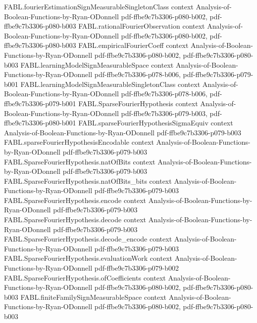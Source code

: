 \begin{theorem}
\proofstep
  {FABL.fourierEstimationSignMeasurableSingletonClass}
  {context}
  {Analysis-of-Boolean-Functions-by-Ryan-ODonnell}
  {pdf-ffbe9c7b3306-p080-b002,
    pdf-ffbe9c7b3306-p080-b003}
\proofstep
  {FABL.rationalFourierObservation}
  {context}
  {Analysis-of-Boolean-Functions-by-Ryan-ODonnell}
  {pdf-ffbe9c7b3306-p080-b002,
    pdf-ffbe9c7b3306-p080-b003}
\proofstep
  {FABL.empiricalFourierCoeff}
  {context}
  {Analysis-of-Boolean-Functions-by-Ryan-ODonnell}
  {pdf-ffbe9c7b3306-p080-b002,
    pdf-ffbe9c7b3306-p080-b003}
\proofstep
  {FABL.learningModelSignMeasurableSpace}
  {context}
  {Analysis-of-Boolean-Functions-by-Ryan-ODonnell}
  {pdf-ffbe9c7b3306-p078-b006,
    pdf-ffbe9c7b3306-p079-b001}
\proofstep
  {FABL.learningModelSignMeasurableSingletonClass}
  {context}
  {Analysis-of-Boolean-Functions-by-Ryan-ODonnell}
  {pdf-ffbe9c7b3306-p078-b006,
    pdf-ffbe9c7b3306-p079-b001}
\proofstep
  {FABL.SparseFourierHypothesis}
  {context}
  {Analysis-of-Boolean-Functions-by-Ryan-ODonnell}
  {pdf-ffbe9c7b3306-p079-b003,
    pdf-ffbe9c7b3306-p080-b001}
\proofstep
  {FABL.sparseFourierHypothesisSigmaEquiv}
  {context}
  {Analysis-of-Boolean-Functions-by-Ryan-ODonnell}
  {pdf-ffbe9c7b3306-p079-b003}
\proofstep
  {FABL.sparseFourierHypothesisEncodable}
  {context}
  {Analysis-of-Boolean-Functions-by-Ryan-ODonnell}
  {pdf-ffbe9c7b3306-p079-b003}
\proofstep
  {FABL.SparseFourierHypothesis.natOfBits}
  {context}
  {Analysis-of-Boolean-Functions-by-Ryan-ODonnell}
  {pdf-ffbe9c7b3306-p079-b003}
\proofstep
  {FABL.SparseFourierHypothesis.natOfBits_bits}
  {context}
  {Analysis-of-Boolean-Functions-by-Ryan-ODonnell}
  {pdf-ffbe9c7b3306-p079-b003}
\proofstep
  {FABL.SparseFourierHypothesis.encode}
  {context}
  {Analysis-of-Boolean-Functions-by-Ryan-ODonnell}
  {pdf-ffbe9c7b3306-p079-b003}
\proofstep
  {FABL.SparseFourierHypothesis.decode}
  {context}
  {Analysis-of-Boolean-Functions-by-Ryan-ODonnell}
  {pdf-ffbe9c7b3306-p079-b003}
\proofstep
  {FABL.SparseFourierHypothesis.decode_encode}
  {context}
  {Analysis-of-Boolean-Functions-by-Ryan-ODonnell}
  {pdf-ffbe9c7b3306-p079-b003}
\proofstep
  {FABL.SparseFourierHypothesis.evaluationWork}
  {context}
  {Analysis-of-Boolean-Functions-by-Ryan-ODonnell}
  {pdf-ffbe9c7b3306-p079-b002}
\proofstep
  {FABL.SparseFourierHypothesis.ofCoefficients}
  {context}
  {Analysis-of-Boolean-Functions-by-Ryan-ODonnell}
  {pdf-ffbe9c7b3306-p080-b002,
    pdf-ffbe9c7b3306-p080-b003}
\proofstep
  {FABL.finiteFamilySignMeasurableSpace}
  {context}
  {Analysis-of-Boolean-Functions-by-Ryan-ODonnell}
  {pdf-ffbe9c7b3306-p080-b002,
    pdf-ffbe9c7b3306-p080-b003}

\end{theorem}
